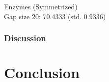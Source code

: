 \documentclass{article}
\begin{document}
Enzymes (Symmetrized) \\

Gap size 20: 70.4333 (std. 0.9336) \\

\subsubsection{Discussion}

\section{Conclusion}



\newpage
\end{document}
